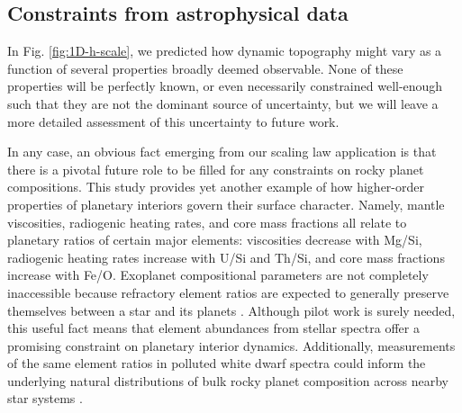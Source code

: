 

\subsection{Constraints from astrophysical data} \label{sec:obvs}

In Fig. \ref{fig:1D-h-scale}, we predicted how dynamic topography might vary as a function of several properties broadly deemed observable. None of these properties will be perfectly known, or even necessarily constrained well-enough such that they are not the dominant source of uncertainty, but we will leave a more detailed assessment of this uncertainty to future work.

In any case, an obvious fact emerging from our scaling law application is that there is a pivotal future role to be filled for any constraints on rocky planet compositions. This study provides yet another example of how higher-order properties of planetary interiors govern their surface character. Namely, mantle viscosities, radiogenic heating rates, and core mass fractions all relate to planetary ratios of certain major elements: viscosities decrease with Mg/Si, radiogenic heating rates increase with U/Si and Th/Si, and core mass fractions increase with Fe/O. Exoplanet compositional parameters are not completely inaccessible because refractory element ratios are expected to generally preserve themselves between a star and its planets \citep{thiabaud_elemental_2015, hinkel_star_2018, putirka_composition_2019, adibekyan_compositional_2021}. Although pilot work is surely needed, this useful fact means that element abundances from stellar spectra offer a promising constraint on planetary interior dynamics. Additionally, measurements of the same element ratios in polluted white dwarf spectra could inform the underlying natural distributions of bulk rocky planet composition across nearby star systems \citep{bonsor_hoststar_2021}. 


